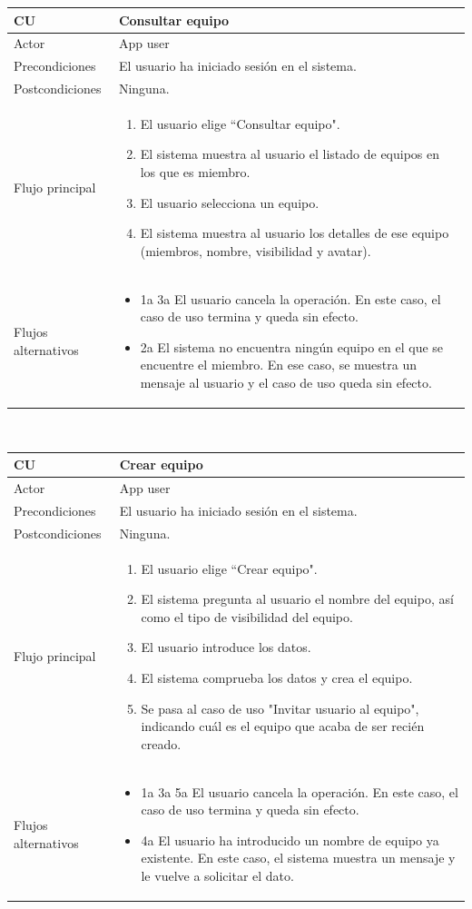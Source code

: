 \documentclass[twoside]{report}
\newcommand\addrow[2]{#1 &#2\\ }
\newcommand\addheading[2]{#1 &#2\\ \hline}
\newcommand\tabularhead{\begin{tabular}{lp{0.7\textwidth}}
\hline
}
\newenvironment{usecase}{\tabularhead}
{\hline\end{tabular}}
\begin{document}
\begin{usecase}
  \addheading{\textbf{CU\arabic{usecase}}}{Consultar equipo} 
  \addrow{Actor}{App user}
  \addrow{Precondiciones}{El usuario ha iniciado sesión en el sistema.}
  \addrow{Postcondiciones}{Ninguna.}
  \addrow{Flujo principal}{
  		\begin{enumerate}
  		\item El usuario elige “Consultar equipo". %
  		\item El sistema muestra al usuario el listado de equipos en los que es miembro. %
  		\item El usuario selecciona un equipo. %
  		\item El sistema muestra al usuario los detalles de ese equipo (miembros, nombre, visibilidad y avatar). %
  		\end{enumerate}
  }
  \addrow{Flujos alternativos}{
  		\begin{itemize}
  		\item 1a 3a El usuario cancela la operación. En este caso, el caso de uso termina y queda sin efecto.
  		\item 2a El sistema no encuentra ningún equipo en el que se encuentre el miembro. En ese caso, se muestra un mensaje al usuario y el caso de uso queda sin efecto.
  		\end{itemize}
  }
\end{usecase}\\

\begin{usecase}
  \addheading{\textbf{CU\arabic{usecase}}}{Crear equipo} 
  \addrow{Actor}{App user}
  \addrow{Precondiciones}{El usuario ha iniciado sesión en el sistema.}
  \addrow{Postcondiciones}{Ninguna.}
  \addrow{Flujo principal}{
  		\begin{enumerate}
  		\item El usuario elige “Crear equipo". %
  		\item El sistema pregunta al usuario el nombre del equipo, así como el tipo de visibilidad del equipo. %
  		\item El usuario introduce los datos. %
  		\item El sistema comprueba los datos y crea el equipo. %
  		\item Se pasa al caso de uso "Invitar usuario al equipo", indicando cuál es el equipo que acaba de ser recién creado.
  		\end{enumerate}
  }
  \addrow{Flujos alternativos}{
  		\begin{itemize}
  		\item 1a 3a 5a El usuario cancela la operación. En este caso, el caso de uso termina y queda sin efecto.
  		\item 4a El usuario ha introducido un nombre de equipo ya existente. En este caso, el sistema muestra un mensaje y le vuelve a solicitar el dato.
  		\end{itemize}
  }
\end{usecase}\\
\end{document}
